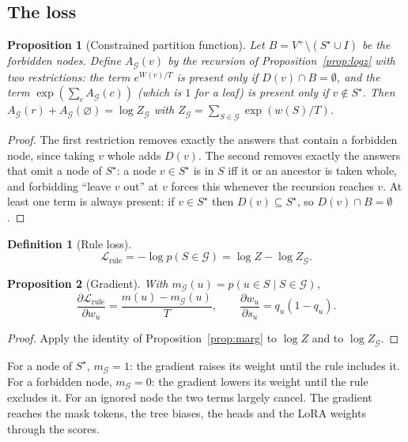 \documentclass[11pt,a4paper]{article}
\newtheorem{proposition}{Proposition}
\theoremstyle{definition}
\newtheorem{definition}{Definition}
\theoremstyle{remark}
\newcommand{\nul}{\varnothing}
\newcommand{\cG}{\mathcal{G}}
\begin{document}
\subsection{The loss}
\begin{proposition}[Constrained partition function]\label{prop:cons}
Let $B=V^+\setminus(S^\star\cup I)$ be the forbidden nodes. Define $A_\cG(v)$ by the recursion of
Proposition~\ref{prop:logz} with two restrictions: the term $e^{W(v)/T}$ is present only if $D(v)\cap B=\emptyset$,
and the term $\exp(\sum_cA_\cG(c))$ (which is $1$ for a leaf) is present only if $v\notin S^\star$. Then
$A_\cG(r)+A_\cG(\nul)=\log Z_\cG$ with $Z_\cG=\sum_{S\in\cG}\exp(w(S)/T)$.
\end{proposition}
\begin{proof}
The first restriction removes exactly the answers that contain a forbidden node, since taking $v$ whole adds
$D(v)$. The second removes exactly the answers that omit a node of $S^\star$: a node $v\in S^\star$ is in $S$ iff it or
an ancestor is taken whole, and forbidding ``leave $v$ out'' at $v$ forces this whenever the recursion reaches $v$.
At least one term is always present: if $v\in S^\star$ then $D(v)\subseteq S^\star$, so $D(v)\cap B=\emptyset$.
\end{proof}

\begin{definition}[Rule loss]
\begin{equation}\label{eq:loss}
\mathcal{L}_{\mathrm{rule}}=-\log p(S\in\cG)=\log Z-\log Z_\cG .
\end{equation}
\end{definition}

\begin{proposition}[Gradient]\label{prop:grad}
With $m_\cG(u)=p(u\in S\mid S\in\cG)$,
\[
\frac{\partial\mathcal{L}_{\mathrm{rule}}}{\partial w_u}=\frac{m(u)-m_\cG(u)}{T},\qquad
\frac{\partial w_u}{\partial s_u}=q_u(1-q_u).
\]
\end{proposition}
\begin{proof}
Apply the identity of Proposition~\ref{prop:marg} to $\log Z$ and to $\log Z_\cG$.
\end{proof}
\noindent For a node of $S^\star$, $m_\cG=1$: the gradient raises its weight until the rule includes it. For a
forbidden node, $m_\cG=0$: the gradient lowers its weight until the rule excludes it. For an ignored node the two
terms largely cancel. The gradient reaches the mask tokens, the tree biases, the heads and the LoRA weights through
the scores.
\end{document}
